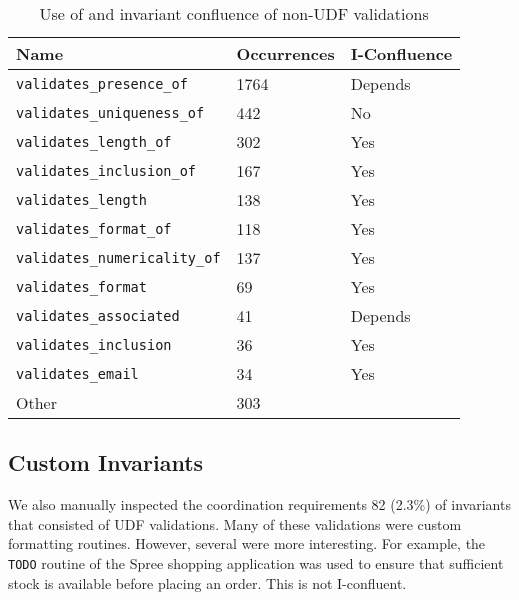 \begin{table}
\begin{tabular}{|l l l |}
\hline
Name & Occurrences & I-Confluence\\\hline
\texttt{validates\_presence\_of} & 1764 & Depends\\
\texttt{validates\_uniqueness\_of} & 442 & No \\
\texttt{validates\_length\_of} & 302 & Yes \\
\texttt{validates\_inclusion\_of} & 167 & Yes\\
\texttt{validates\_length} & 138 & Yes \\
\texttt{validates\_format\_of} & 118 & Yes\\
\texttt{validates\_numericality\_of} & 137 & Yes \\
\texttt{validates\_format} & 69 & Yes \\
\texttt{validates\_associated} & 41 & Depends\\
\texttt{validates\_inclusion} & 36 & Yes \\
\texttt{validates\_email} & 34 & Yes \\
Other & 303 & \\\hline
\end{tabular}
\caption{Use of and invariant confluence of non-UDF validations}
\label{table:builtins}
\end{table}

\subsection{Custom Invariants}

We also manually inspected the coordination requirements 82 (2.3\%) of
invariants that consisted of UDF validations. Many of these
validations were custom formatting routines. However, several were
more interesting. For example, the \texttt{TODO} routine of the Spree
shopping application was used to ensure that sufficient stock is
available before placing an order. This is not I-confluent.


